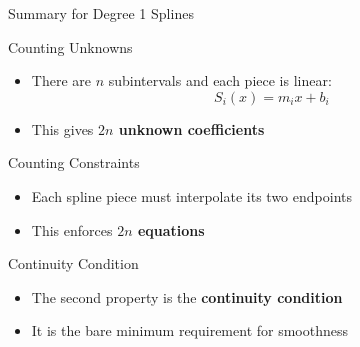 \documentclass[10pt]{beamer}
\begin{document}
\begin{frame}{Summary for Degree 1 Splines}

\begin{block}{Counting Unknowns}
\begin{itemize}
    \item There are $n$ subintervals and each piece is linear:
    \[
        S_i(x) = m_i x + b_i
    \]
    \item This gives \textbf{$2n$ unknown coefficients}
\end{itemize}
\end{block}

\begin{block}{Counting Constraints}
\begin{itemize}
    \item Each spline piece must interpolate its two endpoints
    \item This enforces \textbf{$2n$ equations}
\end{itemize}
\end{block}



\end{frame}
\begin{frame}{Continuity Condition}

\begin{itemize}
    \item The second property is the \textbf{continuity condition}
    \item It is the bare minimum requirement for smoothness
\end{itemize}

{
}

\end{frame}
\end{document}

